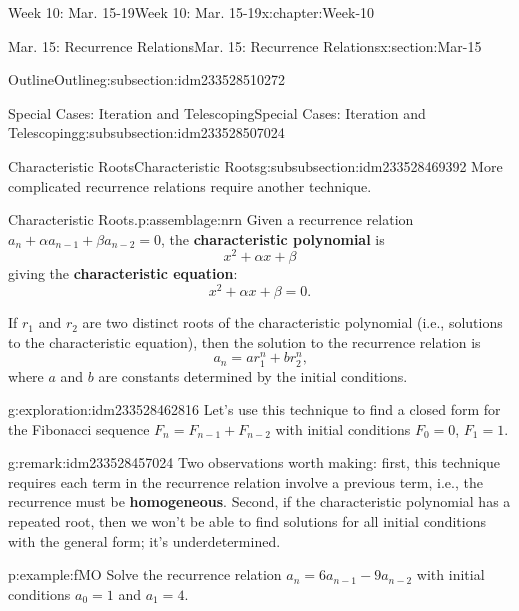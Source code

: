 \documentclass[oneside,10pt,]{book}
\newcommand{\terminology}[1]{\textbf{#1}}
\numberwithin{equation}{section}
\begin{document}
\begin{chapterptx}{Week 10: Mar. 15-19}{}{Week 10: Mar. 15-19}{}{}{x:chapter:Week-10}
\begin{sectionptx}{Mar. 15: Recurrence Relations}{}{Mar. 15: Recurrence Relations}{}{}{x:section:Mar-15}
\begin{subsectionptx}{Outline}{}{Outline}{}{}{g:subsection:idm233528510272}
\begin{subsubsectionptx}{Special Cases: Iteration and Telescoping}{}{Special Cases: Iteration and Telescoping}{}{}{g:subsubsection:idm233528507024}
\end{subsubsectionptx}
%
%
\typeout{************************************************}
\typeout{************************************************}
%
\begin{subsubsectionptx}{Characteristic Roots}{}{Characteristic Roots}{}{}{g:subsubsection:idm233528469392}
More complicated recurrence relations require another technique.%
\begin{assemblage}{Characteristic Roots.}{p:assemblage:nrn}%
 Given a recurrence relation \(a_n + \alpha a_{n-1} + \beta a_{n-2} = 0\), the \terminology{characteristic polynomial} is %
\begin{equation*}
x^2 + \alpha x + \beta
\end{equation*}
giving the \terminology{characteristic equation}: %
\begin{equation*}
x^2 + \alpha x + \beta = 0\text{.}
\end{equation*}
%
\par
{} If \(r_1\) and \(r_2\) are two distinct roots of the characteristic polynomial (i.e., solutions to the characteristic equation), then the solution to the recurrence relation is%
\begin{equation*}
a_n = ar_1^n + br_2^n\text{,}
\end{equation*}
where \(a\) and \(b\) are constants determined by the initial conditions.%
\end{assemblage}
\begin{exploration}{}{g:exploration:idm233528462816}%
Let's use this technique to find a closed form for the Fibonacci sequence \(F_n = F_{n-1} + F_{n-2}\) with initial conditions \(F_0 = 0\), \(F_1 = 1\).%
\end{exploration}%
\begin{remark}{}{g:remark:idm233528457024}%
Two observations worth making: first, this technique requires each term in the recurrence relation involve a previous term, i.e., the recurrence must be \terminology{homogeneous}. Second, if the characteristic polynomial has a repeated root, then we won't be able to find solutions for all initial conditions with the general form; it's underdetermined.%
\end{remark}
\begin{example}{}{p:example:fMO}%
Solve the recurrence relation \(a_n = 6a_{n-1} - 9a_{n-2}\) with initial conditions \(a_0 = 1\) and \(a_1 = 4\).%

\end{example}
\end{subsubsectionptx}
\end{subsectionptx}
\end{sectionptx}
\end{chapterptx}
\end{document}
